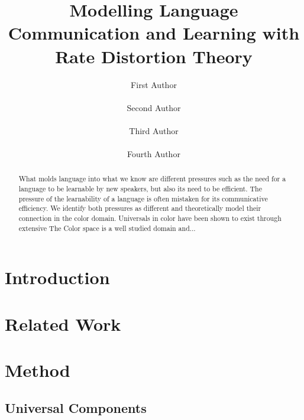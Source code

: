 \documentclass[11pt]{article}
\title{Modelling Language Communication and Learning with \\ Rate Distortion Theory}
\author{First Author \\
 \\\And
 Second Author \\
 \\\AND
 Third Author \\
 \\\And
 Fourth Author \\
 }
\date{}
\begin{document}
\maketitle
\begin{abstract}
  What molds language into what we know are different pressures such as the need for a language to be learnable by new speakers, but also its need to be efficient.
  The pressure of the learnability of a language is often mistaken for its communicative efficiency.
  We identify both pressures as different and theoretically model their connection in the color domain.
  Universals in color have been shown to exist through extensive 
  The Color space is a well studied domain and...
\end{abstract}

\section{Introduction}
\section{Related Work}
\section{Method}

\subsection{Universal Components}
\label{sec:uni_components}
\end{document}
